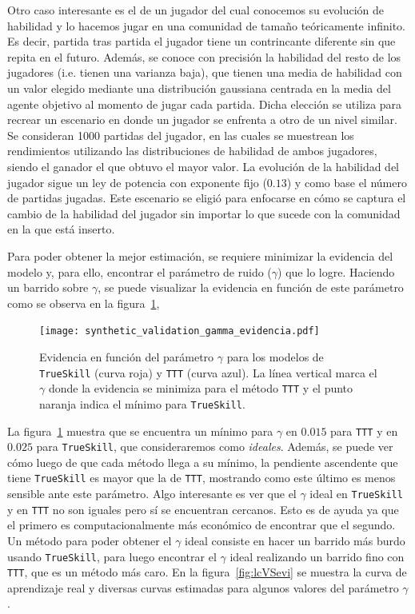 \documentclass[11pt,twoside,spanish]{report} %
\begin{document}
Otro caso interesante es el de un jugador del cual conocemos su evoluci\'on de habilidad y lo hacemos jugar en una comunidad de tama\~no te\'oricamente infinito.
Es decir, partida tras partida el jugador tiene un contrincante diferente sin que repita en el futuro. 
Adem\'as, se conoce con precisi\'on la habilidad del resto de los jugadores (i.e. tienen una varianza baja), que tienen una media de habilidad con un valor elegido mediante una distribuci\'on gaussiana centrada en la media del agente objetivo al momento de jugar cada partida.
Dicha elecci\'on se utiliza para recrear un escenario en donde un jugador se enfrenta a otro de un nivel similar.
Se consideran 1000 partidas del jugador, en las cuales se muestrean los rendimientos utilizando las distribuciones de habilidad de ambos jugadores, siendo el ganador el que obtuvo el mayor valor. 
La evoluci\'on de la habilidad del jugador sigue un ley de potencia con exponente fijo ($0.13$) y como base el n\'umero de partidas jugadas.
Este escenario se eligi\'o para enfocarse en c\'omo se captura el cambio de la habilidad del jugador sin importar lo que sucede con la comunidad en la que est\'a inserto.

Para poder obtener la mejor estimaci\'on, se requiere minimizar la evidencia del modelo y, para ello, encontrar el par\'ametro de ruido ($\gamma$) que lo logre.
Haciendo un barrido sobre $\gamma$, se puede visualizar la evidencia en funci\'on de este par\'ametro como se observa en la figura~\ref{fig:gammaVSev},

\begin{figure}[H]
	\centering
	\texttt{[image: synthetic\_validation\_gamma\_evidencia.pdf]}
	\caption{Evidencia en funci\'on del par\'ametro $\gamma$ para los modelos de \texttt{TrueSkill} (curva roja) y \texttt{TTT} (curva azul). 
	La l\'inea vertical marca el $\gamma$ donde la evidencia se minimiza para el m\'etodo \texttt{TTT} y el punto naranja indica el m\'inimo para \texttt{TrueSkill}.}
	\label{fig:gammaVSev}
\end{figure}

La figura~\ref{fig:gammaVSev} muestra que se encuentra un m\'inimo para $\gamma$ en $0.015$ para \texttt{TTT} y en $0.025$ para \texttt{TrueSkill}, que consideraremos como \emph{ideales}.
Adem\'as, se puede ver c\'omo luego de que cada m\'etodo llega a su m\'inimo, la pendiente ascendente que tiene \texttt{TrueSkill} es mayor que la de \texttt{TTT}, mostrando como este \'ultimo es menos sensible ante este par\'ametro.
Algo interesante es ver que el $\gamma$ ideal en \texttt{TrueSkill} y en \texttt{TTT} no son iguales pero s\'i se encuentran cercanos.
Esto es de ayuda ya que el primero es computacionalmente m\'as econ\'omico de encontrar que el segundo.
Un m\'etodo para poder obtener el $\gamma$ ideal consiste en hacer un barrido m\'as burdo usando \texttt{TrueSkill}, para luego encontrar el $\gamma$ ideal realizando un barrido fino con \texttt{TTT}, que es un m\'etodo m\'as caro.
En la figura~\ref{fig:lcVSevi} se muestra la curva de aprendizaje real y diversas curvas estimadas para algunos valores del par\'ametro $\gamma$.
\end{document}
